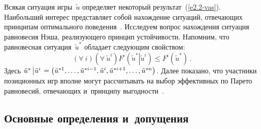 \begin{multicols}{2}
    Всякая ситуация игры~$\tilde{u}$ определяет некоторый  
результат~(\ref{e2.2-vas}). Наибольший интерес представляет собой нахождение 
ситуаций, отвечающих принципам оптимального поведения~\cite{1-vas}. Исследуем 
вопрос нахождения ситуация равновесия Нэша, реализующего принцип 
устойчивости. Напомним, что равновесная ситуация~$\tilde{u}^*$ обладает 
следующим свойством:
    \begin{equation}
    \left(\forall\ i\right) \left( \forall\ \tilde{u}^i\right) F^i
    \left( \tilde{u}^* \left\vert 
\tilde{u}^i\right. \right) \leq F^i\left( \tilde{u}^*\right)\,.
    \label{e2.3-vas}
    \end{equation}
Здесь $\tilde{u}^* \left\vert \tilde{u}^i\right. \hm= \left( \tilde{u}^{*1},\ldots, 
\tilde{u}^{*i-1}, \tilde{u}^i, \tilde{u}^{*i+1},\ldots, \tilde{u}^{*n}\right)$. Далее 
показано, что участники позиционных игр вполне могут рассчитывать на выбор 
эффективных по Парето равновесий, отвечающих и~принципу выгодности~\cite{1-vas, 4-vas}.

    \subsection{Основные определения и~допущения}
    

\end{multicols}

